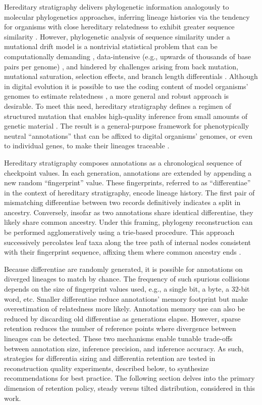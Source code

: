 Hereditary stratigraphy delivers phylogenetic information analogously to molecular phylogenetics approaches, inferring lineage histories via the tendency for organisms with close hereditary relatedness to exhibit greater sequence similarity \citep{yang2012molecular}.
However, phylogenetic analysis of sequence similarity under a mutational drift model is a nontrivial statistical problem \citep{neyman1971molecular} that can be computationally demanding \citep{konno2022deep,stamatakis2013novel}, data-intensive (e.g., upwards of thousands of base pairs per genome) \citep{parks2009increasing,cloutier2019whole,wortley2005much}, and hindered by challenges arising from back mutation, mutational saturation, selection effects, and branch length differentials \citep{brocchieri2001phylogenetic,moreira2000molecular}.
Although in digital evolution it is possible to use the coding content of model organisms' genomes to estimate relatedness \citep{moreno2021case}, a more general and robust approach is desirable.
To meet this need, hereditary stratigraphy defines a regimen of structured mutation that enables high-quality inference from small amounts of genetic material \citep{moreno2022hereditary}.
The result is a general-purpose framework for phenotypically neutral ``annotations'' that can be affixed to digital organisms' genomes, or even to individual genes, to make their lineages traceable \citep{moreno2022hstrat}.

Hereditary stratigraphy composes annotations as a chronological sequence of checkpoint values.
In each generation, annotations are extended by appending a new random ``fingerprint'' value.
These fingerprints, referred to as ``differentiae'' in the context of hereditary stratigraphy, encode lineage history.
The first pair of mismatching differentiae between two records definitively indicates a split in ancestry.
Conversely, insofar as two annotations share identical differentiae, they likely share common ancestry.
Under this framing, phylogeny reconstruction can be performed agglomeratively using a trie-based procedure.
This approach successively percolates leaf taxa along the tree path of internal nodes consistent with their fingerprint sequence, affixing them where common ancestry ends \citep{moreno2024analysis}.

Because differentiae are randomly generated, it is possible for annotations on diverged lineages to match by chance.
The frequency of such spurious collisions depends on the size of fingerprint values used, e.g., a single bit, a byte, a 32-bit word, etc.
Smaller differentiae reduce annotations' memory footprint but make overestimation of relatedness more likely.
Annotation memory use can also be reduced by discarding old differentiae as generations elapse.
However, sparse retention reduces the number of reference points where divergence between lineages can be detected.
These two mechanisms enable tunable trade-offs between annotation size, inference precision, and inference accuracy.
As such, strategies for differentia sizing and differentia retention are tested in reconstruction quality experiments, described below, to synthesize recommendations for best practice.
The following section delves into the primary dimension of retention policy, steady versus tilted distribution, considered in this work.

